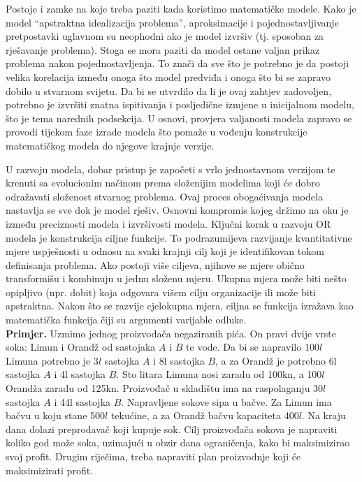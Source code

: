\documentclass[a4paper, utf8, 11pt, colorlinks]{book}
\begin{document}
  Postoje i zamke na koje treba paziti kada koristimo matematičke modele. Kako je model ``apstraktna idealizacija problema'', aproksimacije i pojednostavljivanje pretpostavki uglavnom su neophodni ako je model izvršiv (tj. sposoban za rješavanje problema). Stoga se mora paziti da model ostane valjan prikaz problema nakon pojednostavljenja. To znači da 
  sve što je potrebno je da postoji velika korelacija između onoga što model predviđa i onoga što bi se zapravo dobilo u stvarnom svijetu. Da bi se utvrdilo da li je ovaj zahtjev zadovoljen, potrebno je izvršiti znatna ispitivanja i posljedične izmjene u inicijalnom modelu, što je tema narednih podsekcija. U osnovi, provjera valjanosti modela zapravo se provodi tijekom faze izrade modela što pomaže u vođenju konstrukcije matematičkog modela do njegove krajnje verzije. 
  
 U razvoju modela, dobar pristup je započeti s vrlo jednostavnom verzijom te   krenuti sa evolucionim načinom prema složenijim modelima koji će dobro odražavati složenost stvarnog problema. Ovaj proces obogaćivanja modela nastavlja se sve dok je model rješiv. Osnovni kompromis kojeg držimo na oku je između preciznosti modela i izvršivosti modela.
  Ključni korak u razvoju OR modela je konstrukcija ciljne funkcije.
To podrazumijeva razvijanje kvantitativne mjere uspješnosti u odnosu na svaki   krajnji cilj koji je identifikovan tokom definisanja problema.
Ako postoji više ciljeva, njihove se mjere obično transformišu
i kombinuju u jednu složenu mjeru.  Ukupna mjera može biti nešto opipljivo (npr. dobit) koja odgovara višem cilju
organizacije ili može biti apstraktna.  Nakon što se razvije cjelokupna mjera,  ciljna se funkcija izražava kao matematička funkcija čiji su argumenti varijable odluke. \vspace{0.3cm}\\
\textbf{Primjer.}  Uzmimo jednog proizvođa\v ca negaziranih pi\'ca. On pravi dvije vrste soka: Limun i Orandž od sastojaka $A$ i $B$ te vode. Da bi se napravilo 100$l$ Limuna potrebno je 3$l$
sastojka $A$ i 8l sastojka $B$, a za Orandž je potrebno 6l sastojka $A$ i 4l sastojka $B$. Sto litara Limuna nosi zaradu od 100kn, a 100$l$ Orandža zaradu od 125kn. Proizvođa\v c u skladi\v stu
ima na raspolaganju 30$l$ sastojka $A$ i 44l sastojka $B.$ Napravljene sokove sipa u ba\v cve. Za
Limun ima ba\v cvu u koju stane 500$l$ teku\' cine, a za Orandž ba\v cvu kapaciteta 400$l$. Na kraju dana dolazi preprodava\v c koji kupuje sok. Cilj proizvođa\v ca sokova je napraviti koliko god
mo\v ze soka, uzimaju\' ci u obzir dana ograni\v cenja, kako bi maksimizirao svoj profit. Drugim
rije\v cima, treba napraviti plan proizvodnje koji \' ce maksimizirati profit.
\end{document}
